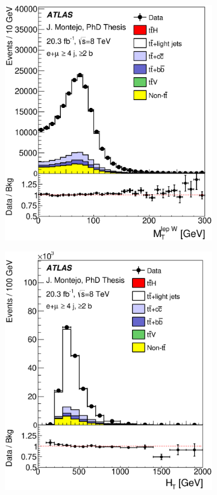 \begin{figure}[tp!]
\begin{subfigure}{0.32\textwidth}
  \includegraphics[width=\textwidth]{Modeling/Figures/plots_4j2b/WlepMT_ELEMUON_4jetin2btagin_NOMINAL.eps}               
  \caption{} \end{subfigure}
  \begin{subfigure}{0.32\textwidth}
  \includegraphics[width=\textwidth]{Modeling/Figures/plots_4j2b/HTAll_ELEMUON_4jetin2btagin_NOMINAL.eps}                

\end{subfigure}
\end{figure}
